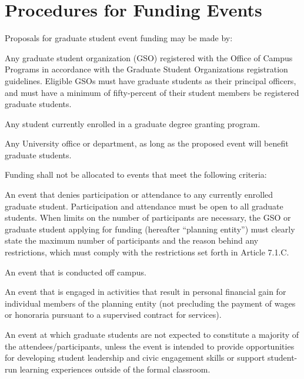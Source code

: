 \section{Procedures for Funding Events}
\begin{bylaws-number}
  \item Proposals for graduate student event funding may be made by:
\begin{bylaws-number}
  \item Any graduate student organization (GSO) registered with the Office of Campus Programs in accordance with the Graduate Student Organizations registration guidelines. Eligible GSOs must have graduate students as their principal officers, and must have a minimum of fifty-percent of their student members be registered graduate students.
  \item Any student currently enrolled in a graduate degree granting program.
  \item Any University office or department, as long as the proposed event will benefit graduate students.
\end{bylaws-number}
  \item Funding shall not be allocated to events that meet the following criteria:
\begin{bylaws-number} 
  \item An event that denies participation or attendance to any currently enrolled graduate student. Participation and attendance must be open to all graduate students. When limits on the number of participants are necessary, the GSO or graduate student applying for funding (hereafter “planning entity”) must clearly state the maximum number of participants and the reason behind any restrictions, which must comply with the restrictions set forth in Article 7.1.C.
  \item An event that is conducted off campus.
  \item An event that is engaged in activities that result in personal financial gain for individual members of the planning entity (not precluding the payment of wages or honoraria pursuant to a supervised contract for services).
  \item An event at which graduate students are not expected to constitute a majority of the attendees/participants, unless the event is intended to provide opportunities for developing student leadership and civic engagement skills or support student-run learning experiences outside of the formal classroom.
\end{bylaws-number}

\end{bylaws-number}
